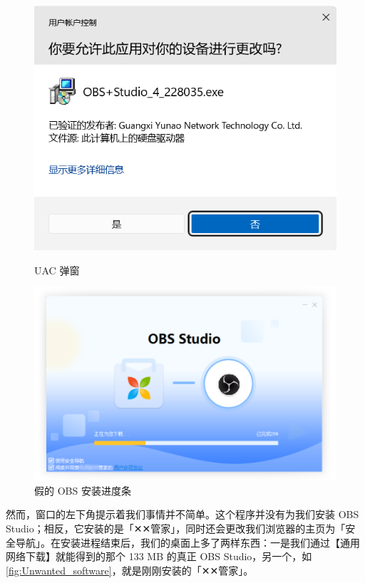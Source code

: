 {{\begin{figure}[htb!]
  \centering
  \begin{minipage}{.44\textwidth}
    \centering
    \includegraphics[width=.8\textwidth]{assets/basic/UAC.png}
    \caption{UAC 弹窗}
    \label{fig:UAC}
  \end{minipage}
  \begin{minipage}{.55\textwidth}
    \centering
    \includegraphics[width=.95\textwidth]{assets/basic/Fake_OBS_install.png}
    \caption{假的 OBS 安装进度条}
    \label{fig:Fake_OBS_install}
  \end{minipage} 
\end{figure}

然而，窗口的左下角提示着我们事情并不简单。这个程序并没有为我们安装 OBS Studio；相反，它安装的是「✕✕管家」，同时还会更改我们浏览器的主页为「安全导航」。在安装进程结束后，我们的桌面上多了两样东西：一是我们通过【通用网络下载】就能得到的那个 133 MB 的真正 OBS Studio，另一个，如\autoref{fig:Unwanted_software}，就是刚刚安装的「✕✕管家」。

}}
